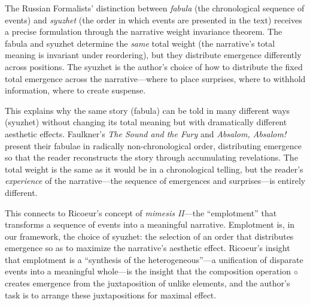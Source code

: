 \begin{interpretation}
\label{interp:fabula-syuzhet}
The Russian Formalists' distinction between \emph{fabula} (the chronological sequence of events) and \emph{syuzhet} (the order in which events are presented in the text) receives a precise formulation through the narrative weight invariance theorem.  The fabula and syuzhet determine the \emph{same} total weight (the narrative's total meaning is invariant under reordering), but they distribute emergence differently across positions.  The syuzhet is the author's choice of how to distribute the fixed total emergence across the narrative---where to place surprises, where to withhold information, where to create suspense.

This explains why the same story (fabula) can be told in many different ways (syuzhet) without changing its total meaning but with dramatically different aesthetic effects.  Faulkner's \textit{The Sound and the Fury} and \textit{Absalom, Absalom!} present their fabulae in radically non-chronological order, distributing emergence so that the reader reconstructs the story through accumulating revelations.  The total weight is the same as it would be in a chronological telling, but the reader's \emph{experience} of the narrative---the sequence of emergences and surprises---is entirely different.

This connects to Ricoeur's concept of \emph{mimesis II}---the ``emplotment'' that transforms a sequence of events into a meaningful narrative.  Emplotment is, in our framework, the choice of syuzhet: the selection of an order that distributes emergence so as to maximize the narrative's aesthetic effect.  Ricoeur's insight that emplotment is a ``synthesis of the heterogeneous''---a unification of disparate events into a meaningful whole---is the insight that the composition operation $\circ$ creates emergence from the juxtaposition of unlike elements, and the author's task is to arrange these juxtapositions for maximal effect.
\end{interpretation}

